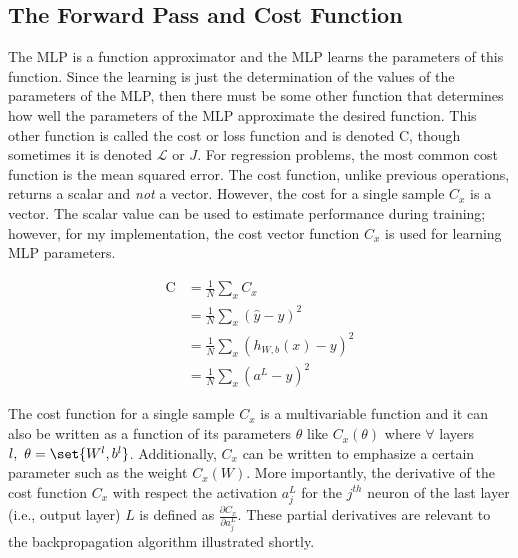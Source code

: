 \documentclass{article}
\DeclarePairedDelimiter\set\{\}
\begin{document}

\subsection{The Forward Pass and Cost Function}

\quad The MLP is a function approximator and the MLP learns the parameters of
this function. Since the learning is just the determination of the values of the
parameters of the MLP, then there must be some other function that determines
how well the parameters of the MLP approximate the desired function. This other
function is called the cost or loss function and is denoted C, though sometimes
it is denoted $\mathcal{L}$ or $J$. For regression problems, the most common
cost function is the mean squared error. The cost function, unlike previous
operations, returns a scalar and \textit{not} a vector. However, the cost for
a single sample $C_x$ is a vector. The scalar value can be used to estimate
performance during training; however, for my implementation, the cost vector
function $C_x$ is used for learning MLP parameters.

\begin{equation}
	\begin{aligned}
		\text{C} & = \frac{1}{N} \sum_{x} {C_x}                   \\
		         & = \frac{1}{N} \sum_{x} {(\hat{y} - y)^{2} }    \\
		         & = \frac{1}{N} \sum_{x} {(h_{W,b}(x) - y)^{2} } \\
		         & = \frac{1}{N} \sum_{x} {(a^{L} - y)^{2} }
	\end{aligned}
\end{equation}

The cost function for a single sample $C_x$ is a multivariable function
and it can also be written as a function of its parameters $\theta$ like
$C_x(\theta)$ where $\forall$ layers $l,\ \theta = \set{W^{l}, b^{l}}$. Additionally,
$C_x$ can be written to emphasize a certain parameter such as the weight $C_x(W)$.
More importantly, the derivative of the cost function $C_x$ with respect the activation
$a_j^{L}$ for the $j^{th}$ neuron of the last layer (i.e., output layer) $L$ is defined as
$\frac{\partial C_x}{\partial a_j^{L}}$. These partial derivatives are
relevant to the backpropagation algorithm illustrated shortly.
\end{document}
